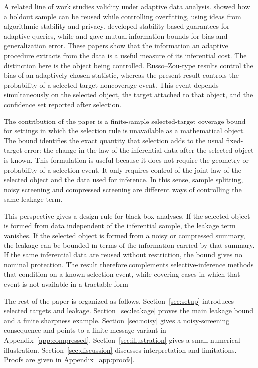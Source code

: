\documentclass[11pt]{article}
\begin{document}
A related line of work studies validity under adaptive data analysis. \citet{dwork2015reusable} showed how a holdout sample can be reused while controlling overfitting, using ideas from algorithmic stability and privacy. \citet{bassily2016algorithmic} developed stability-based guarantees for adaptive queries, while \citet{russo2016controlling} and \citet{xu2017information} gave mutual-information bounds for bias and generalization error. These papers show that the information an adaptive procedure extracts from the data is a useful measure of its inferential cost. The distinction here is the object being controlled. Russo--Zou-type results control the bias of an adaptively chosen statistic, whereas the present result controls the probability of a selected-target noncoverage event. This event depends simultaneously on the selected object, the target attached to that object, and the confidence set reported after selection.

The contribution of the paper is a finite-sample selected-target coverage bound for settings in which the selection rule is unavailable as a mathematical object. The bound identifies the exact quantity that selection adds to the usual fixed-target error: the change in the law of the inferential data after the selected object is known. This formulation is useful because it does not require the geometry or probability of a selection event. It only requires control of the joint law of the selected object and the data used for inference. In this sense, sample splitting, noisy screening and compressed screening are different ways of controlling the same leakage term.

This perspective gives a design rule for black-box analyses. If the selected object is formed from data independent of the inferential sample, the leakage term vanishes. If the selected object is formed from a noisy or compressed summary, the leakage can be bounded in terms of the information carried by that summary. If the same inferential data are reused without restriction, the bound gives no nominal protection. The result therefore complements selective-inference methods that condition on a known selection event, while covering cases in which that event is not available in a tractable form.

The rest of the paper is organized as follows. Section~\ref{sec:setup} introduces selected targets and leakage. Section~\ref{sec:leakage} proves the main leakage bound and a finite sharpness example. Section~\ref{sec:noisy} gives a noisy-screening consequence and points to a finite-message variant in Appendix~\ref{app:compressed}. Section~\ref{sec:illustration} gives a small numerical illustration. Section~\ref{sec:discussion} discusses interpretation and limitations. Proofs are given in Appendix~\ref{app:proofs}.
\end{document}
